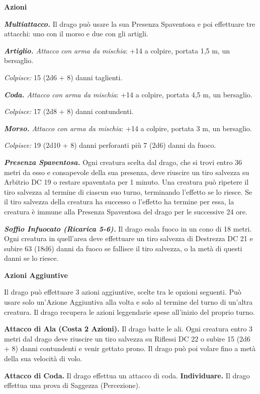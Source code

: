 \begin{multicols}{2}
\textbf{Azioni}

\emph{\textbf{Multiattacco.}} Il drago può usare la sua Presenza
Spaventosa e poi effettuare tre attacchi: uno con il morso e due con gli
artigli.

\emph{\textbf{Artiglio.} Attacco con arma da mischia}: +14 a colpire,
portata 1,5 m, un bersaglio.

\emph{Colpisce:} 15 (2d6 + 8) danni taglienti.

\emph{\textbf{Coda.} Attacco con arma da mischia}: +14 a colpire,
portata 4,5 m, un bersaglio.

\emph{Colpisce:} 17 (2d8 + 8) danni contundenti.

\emph{\textbf{Morso.} Attacco con arma da mischia}: +14 a colpire,
portata 3 m, un bersaglio.

\emph{Colpisce:} 19 (2d10 + 8) danni perforanti più 7 (2d6) danni da
fuoco.

\emph{\textbf{Presenza Spaventosa.}} Ogni creatura scelta dal drago, che
si trovi entro 36 metri da esso e consapevole della sua presenza, deve
riuscire un tiro salvezza su Arbitrio DC 19 o restare spaventata per 1
minuto. Una creatura può ripetere il tiro salvezza al termine di ciascun
suo turno, terminando l'effetto se lo riesce. Se il tiro salvezza della
creatura ha successo o l'effetto ha termine per essa, la creatura è
immune alla Presenza Spaventosa del drago per le successive 24 ore.

\emph{\textbf{Soffio Infuocato (Ricarica 5-6).}} Il drago esala fuoco in
un cono di 18 metri. Ogni creatura in quell'area deve effettuare un tiro
salvezza di Destrezza DC 21 e subire 63 (18d6) danni da fuoco se
fallisce il tiro salvezza, o la metà di questi danni se lo riesce.

\textbf{Azioni Aggiuntive}

Il drago può effettuare 3 azioni aggiuntive, scelte tra le opzioni
seguenti. Può usare solo un'Azione Aggiuntiva alla volta e solo al
termine del turno di un'altra creatura. Il drago recupera le azioni
leggendarie spese all'inizio del proprio turno.

\textbf{Attacco di Ala (Costa 2 Azioni).} Il drago batte le ali. Ogni
creatura entro 3 metri dal drago deve riuscire un tiro salvezza su Riflessi DC 22 o subire 15 (2d6 + 8) danni contundenti e venir gettato
prono. Il drago può poi volare fino a metà della sua velocità di volo.

\textbf{Attacco di Coda.} Il drago effettua un attacco di coda.
\textbf{Individuare.} Il drago effettua una prova di Saggezza
(Percezione).




\end{multicols}
